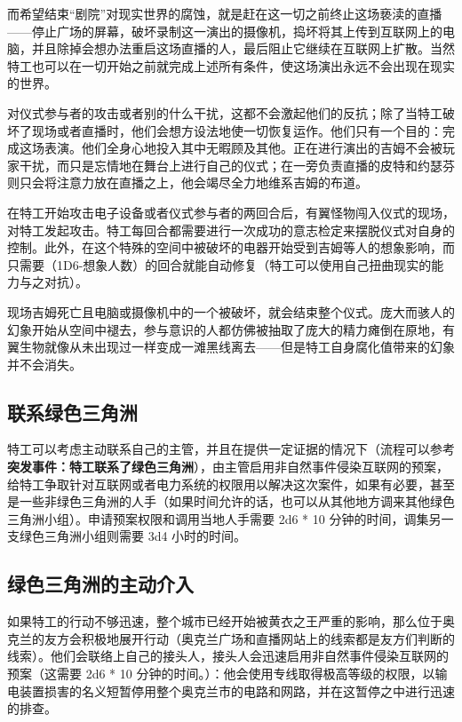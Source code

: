 而希望结束“剧院”对现实世界的腐蚀，就是赶在这一切之前终止这场亵渎的直播——停止广场的屏幕，破坏录制这一演出的摄像机，捣坏将其上传到互联网上的电脑，并且除掉会想办法重启这场直播的人，最后阻止它继续在互联网上扩散。当然特工也可以在一切开始之前就完成上述所有条件，使这场演出永远不会出现在现实的世界。

对仪式参与者的攻击或者别的什么干扰，这都不会激起他们的反抗；除了当特工破坏了现场或者直播时，他们会想方设法地使一切恢复运作。他们只有一个目的：完成这场表演。他们全身心地投入其中无暇顾及其他。正在进行演出的吉姆不会被玩家干扰，而只是忘情地在舞台上进行自己的仪式；在一旁负责直播的皮特和约瑟芬则只会将注意力放在直播之上，他会竭尽全力地维系吉姆的布道。

在特工开始攻击电子设备或者仪式参与者的两回合后，有翼怪物闯入仪式的现场，对特工发起攻击。特工每回合都需要进行一次成功的意志检定来摆脱仪式对自身的控制。此外，在这个特殊的空间中被破坏的电器开始受到吉姆等人的想象影响，而只需要（1D6-想象人数）的回合就能自动修复（特工可以使用自己扭曲现实的能力与之对抗）。

现场吉姆死亡且电脑或摄像机中的一个被破坏，就会结束整个仪式。庞大而骇人的幻象开始从空间中褪去，参与意识的人都仿佛被抽取了庞大的精力瘫倒在原地，有翼生物就像从未出现过一样变成一滩黑线离去——但是特工自身腐化值带来的幻象并不会消失。

\subsection{联系绿色三角洲}

特工可以考虑主动联系自己的主管，并且在提供一定证据的情况下（流程可以参考\textbf{突发事件：特工联系了绿色三角洲}），由主管启用非自然事件侵染互联网的预案，给特工争取针对互联网或者电力系统的权限用以解决这次案件，如果有必要，甚至是一些非绿色三角洲的人手（如果时间允许的话，也可以从其他地方调来其他绿色三角洲小组）。申请预案权限和调用当地人手需要 2d6 * 10 分钟的时间，调集另一支绿色三角洲小组则需要 3d4 小时的时间。

\subsection{绿色三角洲的主动介入}

如果特工的行动不够迅速，整个城市已经开始被黄衣之王严重的影响，那么位于奥克兰的友方会积极地展开行动（奥克兰广场和直播网站上的线索都是友方们判断的线索）。他们会联络上自己的接头人，接头人会迅速启用非自然事件侵染互联网的预案（这需要 2d6 * 10 分钟的时间。）：他会使用专线取得极高等级的权限，以输电装置损害的名义短暂停用整个奥克兰市的电路和网路，并在这暂停之中进行迅速的排查。

